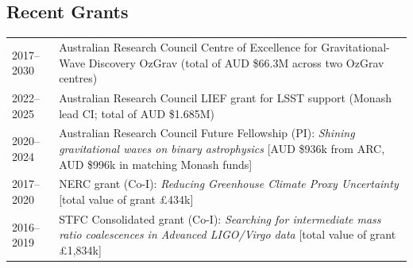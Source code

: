 \documentclass[margin,line]{res}
\begin{document}
\begin{resume}
\section{\sc Recent Grants}
\begin{tabular}{@{}p{0.8in}p{4.7in}}
2017--2030 & Australian Research Council Centre of Excellence for Gravitational-Wave Discovery OzGrav  (total of AUD \$66.3M across two OzGrav centres)\\
2022--2025 &  Australian Research Council LIEF grant for LSST support (Monash lead CI; total of AUD \$1.685M)\\
2020--2024 & Australian Research Council Future Fellowship (PI): {\it  Shining gravitational waves on binary astrophysics} [AUD \$936k from ARC, AUD \$996k in matching Monash funds]\\
2017--2020 & NERC grant (Co-I): {\it Reducing Greenhouse Climate Proxy Uncertainty} [total value of grant \pounds 434k]\\
2016--2019 & STFC Consolidated grant (Co-I): {\it Searching for intermediate mass ratio coalescences in Advanced LIGO/Virgo data} [total value of grant \pounds1,834k]\\
\end{tabular}



\end{resume}
\end{document}
